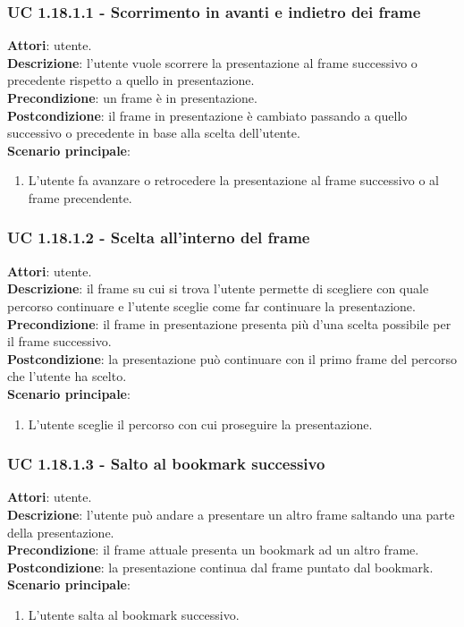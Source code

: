 	\subsubsection{UC 1.18.1.1 - Scorrimento in avanti e indietro dei frame}{
		\label{uc1.18.1.1}
		\textbf{Attori}: utente. \\
		\textbf{Descrizione}: l'utente vuole scorrere la presentazione al frame successivo o precedente rispetto a quello in presentazione. \\
		\textbf{Precondizione}: un frame è in presentazione.	\\
		\textbf{Postcondizione}: il frame in presentazione è cambiato passando a quello successivo o precedente in base alla scelta dell'utente.\\
		\textbf{Scenario principale}:
		\begin{enumerate}
			\item L'utente fa avanzare o retrocedere la presentazione al frame successivo o al frame precendente.
		\end{enumerate}
	}
	\subsubsection{UC 1.18.1.2 - Scelta all'interno del frame}{
		\label{uc1.18.1.2}
		\textbf{Attori}: utente. \\
		\textbf{Descrizione}: il frame su cui si trova l’utente permette di scegliere con quale percorso continuare e l'utente sceglie come far continuare la presentazione. \\
		\textbf{Precondizione}: il frame in presentazione presenta più d'una scelta possibile per il frame successivo.	\\
		\textbf{Postcondizione}: la presentazione può continuare con il primo frame del percorso che l'utente ha scelto.\\
		\textbf{Scenario principale}:
		\begin{enumerate}
			\item L'utente sceglie il percorso con cui proseguire la presentazione.
		\end{enumerate}
	}
	\subsubsection{UC 1.18.1.3 - Salto al bookmark successivo}{
		\label{uc1.18.1.3}
		\textbf{Attori}: utente. \\
		\textbf{Descrizione}: l'utente può andare a presentare un altro frame saltando una parte della presentazione. \\
		\textbf{Precondizione}: il frame attuale presenta un bookmark ad un altro frame.	\\
		\textbf{Postcondizione}: la presentazione continua dal frame puntato dal bookmark.	\\
		\textbf{Scenario principale}:
		\begin{enumerate}
			\item L'utente salta al bookmark successivo.
		\end{enumerate}
	}
